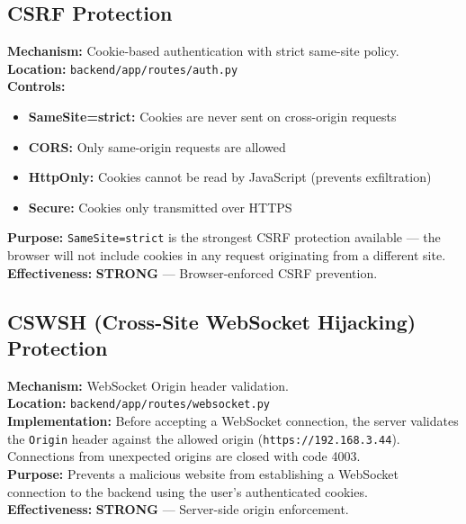 \documentclass[11pt,a4paper]{article}
\begin{document}
\subsection{CSRF Protection}

\begin{tcolorbox}[colback=shieldgreen!5, colframe=shieldgreen]
\textbf{Mechanism:} Cookie-based authentication with strict same-site policy.\\
\textbf{Location:} \texttt{backend/app/routes/auth.py}\\
\textbf{Controls:}
\begin{itemize}[nosep]
  \item \textbf{SameSite=strict:} Cookies are never sent on cross-origin requests
  \item \textbf{CORS:} Only same-origin requests are allowed
  \item \textbf{HttpOnly:} Cookies cannot be read by JavaScript (prevents exfiltration)
  \item \textbf{Secure:} Cookies only transmitted over HTTPS
\end{itemize}
\textbf{Purpose:} \texttt{SameSite=strict} is the strongest CSRF protection available — the browser will not include cookies in any request originating from a different site.\\
\textbf{Effectiveness:} \textcolor{shieldgreen}{\textbf{STRONG}} — Browser-enforced CSRF prevention.
\end{tcolorbox}

\subsection{CSWSH (Cross-Site WebSocket Hijacking) Protection}

\begin{tcolorbox}[colback=shieldgreen!5, colframe=shieldgreen]
\textbf{Mechanism:} WebSocket Origin header validation.\\
\textbf{Location:} \texttt{backend/app/routes/websocket.py}\\
\textbf{Implementation:} Before accepting a WebSocket connection, the server validates the \texttt{Origin} header against the allowed origin (\texttt{https://192.168.3.44}). Connections from unexpected origins are closed with code 4003.\\
\textbf{Purpose:} Prevents a malicious website from establishing a WebSocket connection to the backend using the user's authenticated cookies.\\
\textbf{Effectiveness:} \textcolor{shieldgreen}{\textbf{STRONG}} — Server-side origin enforcement.
\end{tcolorbox}
\end{document}
